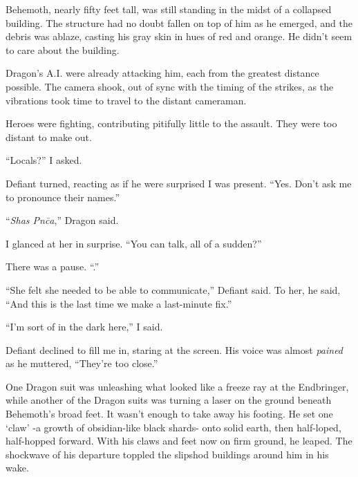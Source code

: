 Behemoth, nearly fifty feet tall, was still standing in the midst of a collapsed building.  The structure had no doubt fallen on top of him as he emerged, and the debris was ablaze, casting his gray skin in hues of red and orange.  He didn't seem to care about the building.



Dragon's A.I. were already attacking him, each from the greatest distance possible.  The camera shook, out of sync with the timing of the strikes, as the vibrations took time to travel to the distant cameraman.



Heroes were fighting, contributing pitifully little to the assault.  They were too distant to make out.



``Locals?'' I asked.



Defiant turned, reacting as if he were surprised I was present.  ``Yes.  Don't ask me to pronounce their names.''



``\emph{Shas Pn\=ca},'' Dragon said.



I glanced at her in surprise.  ``You can talk, all of a sudden?''



There was a pause.  ``\ldotsLittle.''



``She felt she needed to be able to communicate,'' Defiant said.  To her, he said, ``And this is the last time we make a last-minute fix.''



``I'm sort of in the dark here,'' I said.



Defiant declined to fill me in, staring at the screen.  His voice was almost \emph{pained} as he muttered, ``They're too close.''



One Dragon suit was unleashing what looked like a freeze ray at the Endbringer, while another of the Dragon suits was turning a laser on the ground beneath Behemoth's broad feet.  It wasn't enough to take away his footing.  He set one `claw' -a growth of obsidian-like black shards- onto solid earth, then half-loped, half-hopped forward.  With his claws and feet now on firm ground, he leaped.  The shockwave of his departure toppled the slipshod buildings around him in his wake.



